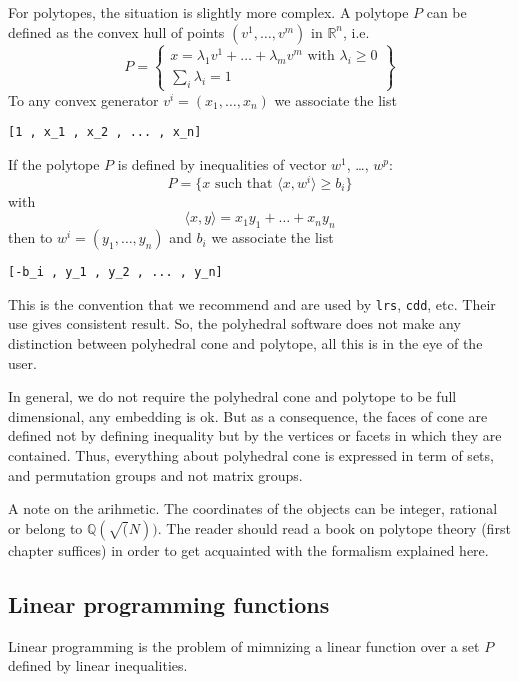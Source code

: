 \documentclass[12pt]{amsart}
\newcommand{\RR}{\ensuremath{\mathbb{R}}}
\newcommand{\QQ}{\ensuremath{\mathbb{Q}}}
\begin{document}
For polytopes, the situation is slightly more complex.
A polytope $P$ can be defined as the convex hull of points
$(v^1, \dots, v^m)$ in $\RR^n$, i.e.
\begin{equation*}
P=\left\{\begin{array}{c}
x=\lambda_1 v^1 + \dots + \lambda_m v^m\mbox{~with~}\lambda_i\geq 0\\
\sum_{i} \lambda_i = 1 
\end{array}\right\}
\end{equation*}
To any convex generator $v^i=(x_1, \dots, x_n)$ we associate the list
\begin{verbatim}
[1 , x_1 , x_2 , ... , x_n]
\end{verbatim}
If the polytope $P$ is defined by inequalities of vector $w^1$, \dots, $w^p$:
\begin{equation*}
P=\{x\mbox{~such~that~} \langle x, w^i\rangle \geq b_i\}
\end{equation*}
with
\begin{equation*}
\langle x, y\rangle = x_1 y_1 + \dots + x_n y_n
\end{equation*}
then to $w^i=(y_1, \dots, y_n)$ and $b_i$ we associate the list
\begin{verbatim}
[-b_i , y_1 , y_2 , ... , y_n]
\end{verbatim}
This is the convention that we recommend and are used by {\tt lrs}, {\tt cdd}, etc. Their use gives consistent result.
So, the polyhedral software does not make any distinction between
polyhedral cone and polytope, all this is in the eye of the user.

In general, we do not require the polyhedral cone and polytope to be full
dimensional, any embedding is ok.
But as a consequence, the faces of cone are defined not by defining inequality
but by the vertices or facets in which they are contained.
Thus, everything about polyhedral cone is expressed in term of sets, and
permutation groups and not matrix groups.

A note on the arihmetic. The coordinates of the objects can be integer, 
rational or belong to $\QQ(\sqrt(N))$.
The reader should read a book on polytope theory (first chapter suffices)
in order to get acquainted with the formalism explained here.


\subsection{Linear programming functions}

Linear programming is the problem of mimnizing a linear function over a set $P$ defined by linear inequalities.
\end{document}
